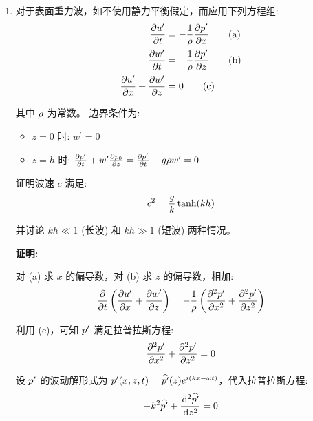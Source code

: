 \begin{enumerate}
    解得圆频率:
    \begin{equation*}
        \frequency = \pm C_0 \sqrt{\frac{k^2 + l^2}{1 + \lambda^2 (k^2 + l^2)}}
    \end{equation*}

    \item 对于表面重力波，如不使用静力平衡假定，而应用下列方程组:
    \begin{align*}
        \pde{u^\prime}{\timevar} &= -\frac{1}{\density} \pde{\pressure^\prime}{x} \tag{a} \\
        \pde{w^\prime}{\timevar} &= -\frac{1}{\density} \pde{\pressure^\prime}{z} \tag{b} \\
        \pde{u^\prime}{x} + \pde{w^\prime}{z} &= 0 \tag{c}
    \end{align*}

    其中 $\rho$ 为常数。
    边界条件为:
    \begin{itemize}
        \item $z = 0$ 时: $w^\prime = 0$
        \item $z = h$ 时: $\pde{\pressure^\prime}{\timevar} + w^\prime \pde{\pressure_0}{z} = \pde{\pressure^\prime}{\timevar} - \gravityconst \density w^\prime = 0$
    \end{itemize}

    证明波速 $c$ 满足:
    \begin{equation*}
        c^2 = \frac{g}{k} \tanh(k h)
    \end{equation*}

    并讨论 $k h \ll 1$ (长波) 和 $k h \gg 1$ (短波) 两种情况。

    \vspace{1em}
    \textbf{证明:}

    对 (a) 求 $x$ 的偏导数，对 (b) 求 $z$ 的偏导数，相加:
    \begin{equation*}
        \pde{}{\timevar}\left(\pde{u^\prime}{x} + \pde{w^\prime}{z}\right) = -\frac{1}{\density} \left(\pde[2]{\pressure^\prime}{x} + \pde[2]{\pressure^\prime}{z}\right)
    \end{equation*}

    利用 (c)，可知 $p^\prime$ 满足拉普拉斯方程:
    \begin{equation*}
        \pde[2]{\pressure^\prime}{x} + \pde[2]{\pressure^\prime}{z} = 0
    \end{equation*}

    设 $p^\prime$ 的波动解形式为 $p^\prime(x, z, t) = \widehat{p^\prime}(z) e^{i (k x - \omega t)}$，代入拉普拉斯方程:
    \begin{equation*}
        -k^2 \complexamp{\pressure^\prime} + \ode[2]{\complexamp{\pressure^\prime}}{z} = 0
    \end{equation*}


\end{enumerate}
